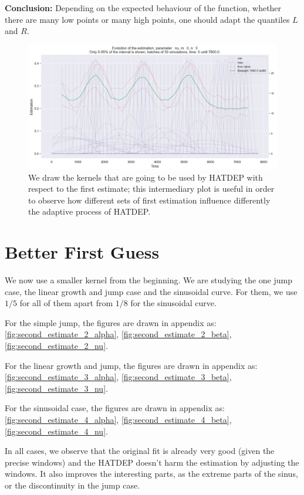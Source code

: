 \textbf{Conclusion:} Depending on the expected behaviour of the function, whether there are many low points or many high points, one should adapt the quantiles $L$ and $R$.


\begin{figure}
\centering
\includegraphics[width = 0.90 \textwidth]{../imag/chap3/IMPACT_G/sin_all_kernels.png}
\caption{We draw the kernels that are going to be used by HATDEP with respect to the first estimate; this intermediary plot is useful in order to observe how different sets of first estimation influence differently the adaptive process of HATDEP.}
\label{fig:impact_g_sin}
\end{figure}




\section{Better First Guess}
\label{section_second_simul}
We now use a smaller kernel from the beginning. We are studying the one jump case, the linear growth and jump case and the sinusoidal curve. For them, we use $1/5$ for all of them apart from $1/8$ for the sinusoidal curve. 



For the simple jump, the figures are drawn in appendix as: \ref{fig:second_estimate_2_alpha}, \ref{fig:second_estimate_2_beta}, \ref{fig:second_estimate_2_nu}.

For the linear growth and jump, the figures are drawn in appendix as: \ref{fig:second_estimate_3_alpha}, \ref{fig:second_estimate_3_beta}, \ref{fig:second_estimate_3_nu}.

For the sinusoidal case, the figures are drawn in appendix as: \ref{fig:second_estimate_4_alpha}, \ref{fig:second_estimate_4_beta}, \ref{fig:second_estimate_4_nu}.

In all cases, we observe that the original fit is already very good (given the precise windows) and the HATDEP doesn't harm the estimation by adjusting the windows. It also improves the interesting parts, as the extreme parts of the sinus, or the discontinuity in the jump case.


